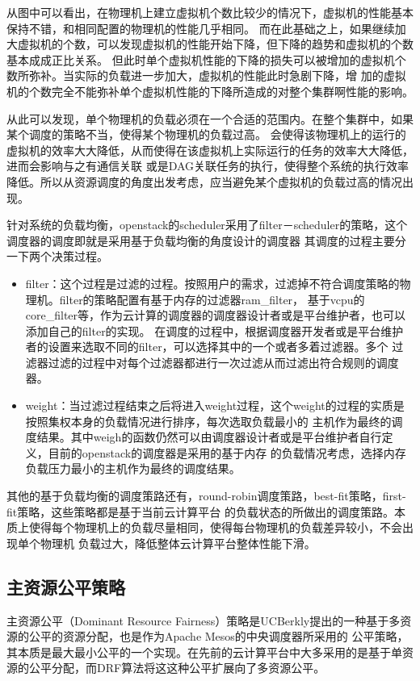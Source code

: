 从图中可以看出，在物理机上建立虚拟机个数比较少的情况下，虚拟机的性能基本保持不错，和相同配置的物理机的性能几乎相同。
而在此基础之上，如果继续加大虚拟机的个数，可以发现虚拟机的性能开始下降，但下降的趋势和虚拟机的个数基本成成正比关系。
但此时单个虚拟机性能的下降的损失可以被增加的虚拟机个数所弥补。当实际的负载进一步加大，虚拟机的性能此时急剧下降，增
加的虚拟机的个数完全不能弥补单个虚拟机性能的下降所造成的对整个集群啊性能的影响。

从此可以发现，单个物理机的负载必须在一个合适的范围内。在整个集群中，如果某个调度的策略不当，使得某个物理机的负载过高。
会使得该物理机上的运行的虚拟机的效率大大降低，从而使得在该虚拟机上实际运行的任务的效率大大降低，进而会影响与之有通信关联
或是DAG关联任务的执行，使得整个系统的执行效率降低。所以从资源调度的角度出发考虑，应当避免某个虚拟机的负载过高的情况出现。

针对系统的负载均衡，openstack的scheduler采用了filter－scheduler的策略，这个调度器的调度即就是采用基于负载均衡的角度设计的调度器
其调度的过程主要分一下两个决策过程。
\begin{itemize}
\item filter：这个过程是过滤的过程。按照用户的需求，过滤掉不符合调度策略的物理机。filter的策略配置有基于内存的过滤器ram\_filter，
基于vcpu的core\_filter等，作为云计算的调度器的调度器设计者或是平台维护者，也可以添加自己的filter的实现。
在调度的过程中，根据调度器开发者或是平台维护者的设置来选取不同的filter，可以选择其中的一个或者多着过滤器。多个
过滤器过滤的过程中对每个过滤器都进行一次过滤从而过滤出符合规则的调度器。
\item weight：当过滤过程结束之后将进入weight过程，这个weight的过程的实质是按照集权本身的负载情况进行排序，每次选取负载最小的
主机作为最终的调度结果。其中weigh的函数仍然可以由调度器设计者或是平台维护者自行定义，目前的openstack的调度器是采用的基于内存
的负载情况考虑，选择内存负载压力最小的主机作为最终的调度结果。
\end{itemize}

其他的基于负载均衡的调度策路还有，round-robin调度策路，best-fit策略，first-fit策略，这些策略都是基于当前云计算平台
的负载状态的所做出的调度策路。本质上使得每个物理机上的负载尽量相同，使得每台物理机的负载差异较小，不会出现单个物理机
负载过大，降低整体云计算平台整体性能下滑。

\subsection{主资源公平策略}
主资源公平（Dominant Resource Fairness）策略是UCBerkly提出的一种基于多资源的公平的资源分配，也是作为Apache Mesos的中央调度器所采用的
公平策略，其本质是最大最小公平的一个实现。在先前的云计算平台中大多采用的是基于单资源的公平分配，而DRF算法将这这种公平扩展向了多资源公平。

